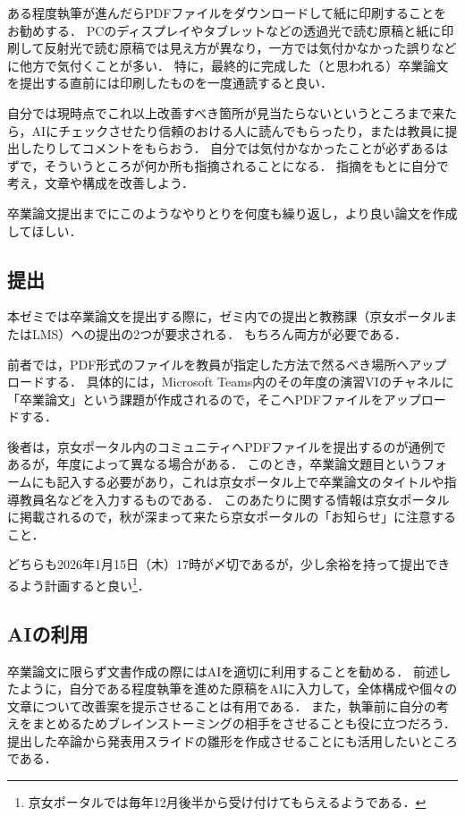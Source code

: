 \documentclass[a4paper,twocolumn,10pt]{jsarticle}
\begin{document}
ある程度執筆が進んだらPDFファイルをダウンロードして紙に印刷することをお勧めする．
PCのディスプレイやタブレットなどの透過光で読む原稿と紙に印刷して反射光で読む原稿では見え方が異なり，一方では気付かなかった誤りなどに他方で気付くことが多い．
特に，最終的に完成した（と思われる）卒業論文を提出する直前には印刷したものを一度通読すると良い．

自分では現時点でこれ以上改善すべき箇所が見当たらないというところまで来たら，AIにチェックさせたり信頼のおける人に読んでもらったり，または教員に提出したりしてコメントをもらおう．
自分では気付かなかったことが必ずあるはずで，そういうところが何か所も指摘されることになる．
指摘をもとに自分で考え，文章や構成を改善しよう．

卒業論文提出までにこのようなやりとりを何度も繰り返し，より良い論文を作成してほしい．

\subsection{提出}

本ゼミでは卒業論文を提出する際に，ゼミ内での提出と教務課（京女ポータルまたはLMS）への提出の2つが要求される．
もちろん両方が必要である．

前者では，PDF形式のファイルを教員が指定した方法で然るべき場所へアップロードする．
具体的には，Microsoft Teams内のその年度の演習VIのチャネルに「卒業論文」という課題が作成されるので，そこへPDFファイルをアップロードする．

後者は，京女ポータル内のコミュニティへPDFファイルを提出するのが通例であるが，年度によって異なる場合がある．
このとき，卒業論文題目というフォームにも記入する必要があり，これは京女ポータル上で卒業論文のタイトルや指導教員名などを入力するものである．
このあたりに関する情報は京女ポータルに掲載されるので，秋が深まって来たら京女ポータルの「お知らせ」に注意すること．

どちらも2026年1月15日（木）17時が〆切であるが，少し余裕を持って提出できるよう計画すると良い\footnote{京女ポータルでは毎年12月後半から受け付けてもらえるようである．}．

\subsection{AIの利用}

卒業論文に限らず文書作成の際にはAIを適切に利用することを勧める．
前述したように，自分である程度執筆を進めた原稿をAIに入力して，全体構成や個々の文章について改善案を提示させることは有用である．
また，執筆前に自分の考えをまとめるためブレインストーミングの相手をさせることも役に立つだろう．
提出した卒論から発表用スライドの雛形を作成させることにも活用したいところである．
\end{document}
